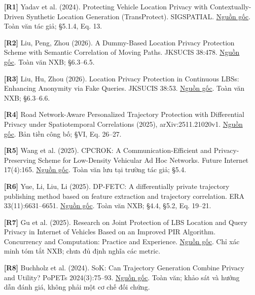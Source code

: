 \documentclass[10pt,a4paper]{article}
\begin{document}
\par\hypertarget{ref-R1}{}\textbf{[R1]} Yadav et al. (2024). Protecting Vehicle Location Privacy with Contextually-Driven Synthetic Location Generation (TransProtect). SIGSPATIAL. \href{https://arxiv.org/html/2409.09495v1}{Nguồn gốc}. Toàn văn tác giả; §5.1.4, Eq. 13.
\par\hypertarget{ref-R2}{}\textbf{[R2]} Liu, Peng, Zhou (2026). A Dummy-Based Location Privacy Protection Scheme with Semantic Correlation of Moving Paths. JKSUCIS 38:478. \href{https://link.springer.com/article/10.1007/s44443-026-00899-w}{Nguồn gốc}. Toàn văn NXB; §6.3–6.5.
\par\hypertarget{ref-R3}{}\textbf{[R3]} Liu, Hu, Zhou (2026). Location Privacy Protection in Continuous LBSs: Enhancing Anonymity via Fake Queries. JKSUCIS 38:53. \href{https://link.springer.com/article/10.1007/s44443-025-00438-z}{Nguồn gốc}. Toàn văn NXB; §6.3–6.6.
\par\hypertarget{ref-R4}{}\textbf{[R4]} Road Network-Aware Personalized Trajectory Protection with Differential Privacy under Spatiotemporal Correlations (2025), arXiv:2511.21020v1. \href{https://arxiv.org/html/2511.21020v1}{Nguồn gốc}. Bản tiền công bố; §VI, Eq. 26–27.
\par\hypertarget{ref-R5}{}\textbf{[R5]} Wang et al. (2025). CPCROK: A Communication-Efficient and Privacy-Preserving Scheme for Low-Density Vehicular Ad Hoc Networks. Future Internet 17(4):165. \href{https://uhra.herts.ac.uk/id/eprint/25705/1/futureinternet-17-00165.pdf}{Nguồn gốc}. Toàn văn lưu tại trường tác giả; §5.4.
\par\hypertarget{ref-R6}{}\textbf{[R6]} Yue, Li, Liu, Li (2025). DP-FETC: A differentially private trajectory publishing method based on feature extraction and trajectory correlation. ERA 33(11):6631–6651. \href{https://www.aimspress.com/aimspress-data/era/2025/11/PDF/era-33-11-293.pdf}{Nguồn gốc}. Toàn văn NXB; §4.4, §5.2, Eq. 19–21.
\par\hypertarget{ref-R7}{}\textbf{[R7]} Gu et al. (2025). Research on Joint Protection of LBS Location and Query Privacy in Internet of Vehicles Based on an Improved PIR Algorithm. Concurrency and Computation: Practice and Experience. \href{https://onlinelibrary.wiley.com/doi/abs/10.1002/cpe.70447}{Nguồn gốc}. Chỉ xác minh tóm tắt NXB; chưa đủ định nghĩa các metric.
\par\hypertarget{ref-R8}{}\textbf{[R8]} Buchholz et al. (2024). SoK: Can Trajectory Generation Combine Privacy and Utility? PoPETs 2024(3):75–93. \href{https://petsymposium.org/popets/2024/popets-2024-0068.pdf}{Nguồn gốc}. Toàn văn; khảo sát và hướng dẫn đánh giá, không phải một cơ chế đối chứng.
\end{document}
